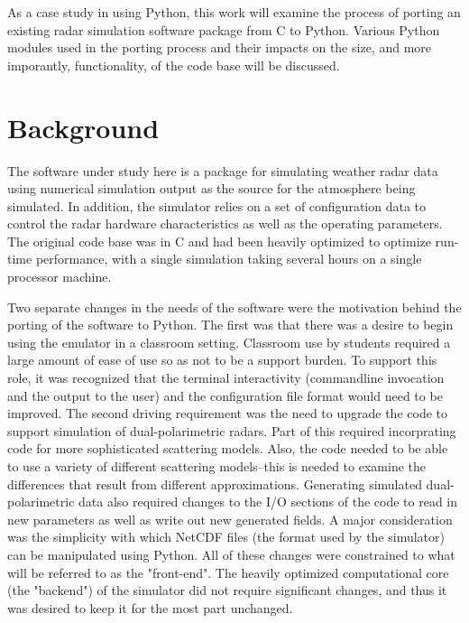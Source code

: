 \documentclass[twocolumn]{article}
\begin{document}
As a case study in using Python, this work will examine the process of porting an existing
radar simulation software package from C to Python.  Various Python modules used in the
porting process and their impacts on the size, and more imporantly, functionality, of the
code base will be discussed.

\section{Background}
The software under study here is a package for simulating weather radar data using
numerical simulation output as the source for the atmosphere being simulated. In addition,
the simulator relies on a set of configuration data to control the radar hardware
characteristics as well as the operating parameters. The original code base was in C
and had been heavily optimized to optimize run-time performance, with a single simulation
taking several hours on a single processor machine.

Two separate changes in the needs of the software were the motivation behind the porting
of the software to Python. The first was that there was a desire to begin using the
emulator in a classroom setting. Classroom use by students required a large amount
of ease of use so as not to be a support burden.  To support this role, it was
recognized that the terminal interactivity (commandline invocation and the output
to the user) and the configuration file format would need to be improved. The second
driving requirement was the need to upgrade the code to support simulation of
dual-polarimetric radars. Part of this required  incorprating code for more
sophisticated scattering models. Also, the code needed to be able to use a variety of different scattering
models--this is needed to examine the differences that result from different approximations.
Generating simulated dual-polarimetric data also required changes to the I/O
sections of the code to read in new parameters as well as write out new generated
fields. A major consideration was the simplicity with which NetCDF files (the 
format used by the simulator) can be manipulated using Python.
All of these changes were constrained to what will be referred to as the "front-end". The
heavily optimized computational core (the "backend") of the simulator did not require significant
changes, and thus it was desired to keep it for the most part unchanged.
\end{document}
